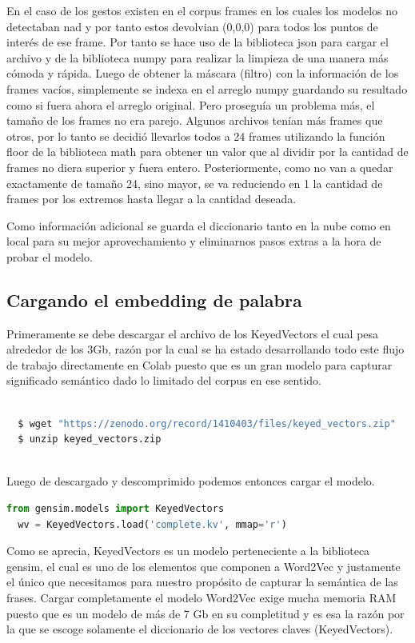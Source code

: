 En el caso de los gestos existen en el corpus frames en los cuales los modelos no detectaban nad y por tanto estos devolvian (0,0,0) para todos los puntos de interés de ese frame. Por tanto se hace uso de la biblioteca json para cargar el archivo y de la biblioteca numpy para realizar la limpieza de una manera más cómoda y rápida.
Luego de obtener la máscara (filtro) con la información de los frames vacíos, simplemente se indexa en el arreglo numpy guardando su resultado como si fuera ahora el arreglo original.
Pero proseguía un problema más, el tamaño de los frames no era parejo. Algunos archivos tenían más frames que otros, por lo tanto se decidió llevarlos todos a 24 frames utilizando la función floor de la biblioteca math para obtener un valor que al dividir por la cantidad de frames no diera superior y fuera entero.
Posteriormente, como no van a quedar exactamente de tamaño 24, sino mayor, se va reduciendo en 1 la cantidad de frames por los extremos hasta llegar a la cantidad deseada.

Como información adicional se guarda el diccionario tanto en la nube como en local para su mejor aprovechamiento y eliminarnos pasos extras a la hora de probar el modelo.

\subsection{Cargando el embedding de palabra}
Primeramente se debe descargar el archivo de los KeyedVectors el cual pesa alrededor de los 3Gb, razón por la cual se ha estado desarrollando todo este flujo de trabajo directamente en Colab puesto que es un gran modelo para capturar significado semántico dado lo limitado del corpus en ese sentido.
\vspace{0.5cm}

\begin{lstlisting}[language=Bash, caption={Descargar datos del modelo KeyedVectors de su sitio web}] 
  
  $ wget "https://zenodo.org/record/1410403/files/keyed_vectors.zip" 
  $ unzip keyed_vectors.zip
  
\end{lstlisting}

Luego de descargado y descomprimido podemos entonces cargar el modelo.

\begin{lstlisting}[language=Python, caption={Cargar modelo de KeyedVectors}]
  from gensim.models import KeyedVectors
  wv = KeyedVectors.load('complete.kv', mmap='r')
\end{lstlisting}
Como se aprecia, KeyedVectors es un modelo perteneciente a la biblioteca gensim, el cual es uno de los elementos que componen a Word2Vec y justamente el único que necesitamos para nuestro propósito de  capturar la semántica de las frases. Cargar completamente el modelo Word2Vec exige mucha memoria RAM puesto que es un modelo de más de 7 Gb en su completitud y es esa la razón por la que se escoge solamente el diccionario de los vectores claves (KeyedVectors).

